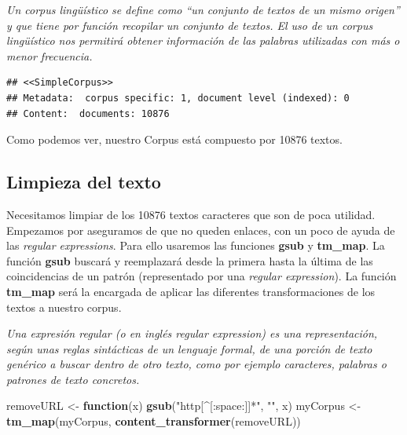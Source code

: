 \documentclass[]{article}
\newenvironment{Shaded}{\begin{snugshade}}{\end{snugshade}}
\newcommand{\ControlFlowTok}[1]{\textcolor[rgb]{0.13,0.29,0.53}{\textbf{#1}}}
\newcommand{\KeywordTok}[1]{\textcolor[rgb]{0.13,0.29,0.53}{\textbf{#1}}}
\newcommand{\NormalTok}[1]{#1}
\newcommand{\OperatorTok}[1]{\textcolor[rgb]{0.81,0.36,0.00}{\textbf{#1}}}
\newcommand{\StringTok}[1]{\textcolor[rgb]{0.31,0.60,0.02}{#1}}
\begin{document}
\emph{Un corpus lingüístico se define como ``un conjunto de textos de un
mismo origen'' y que tiene por función recopilar un conjunto de textos.
El uso de un corpus lingüístico nos permitirá obtener información de las
palabras utilizadas con más o menor frecuencia.}

\begin{Shaded}
\end{Shaded}

\begin{verbatim}
## <<SimpleCorpus>>
## Metadata:  corpus specific: 1, document level (indexed): 0
## Content:  documents: 10876
\end{verbatim}

Como podemos ver, nuestro Corpus está compuesto por 10876 textos.

\hypertarget{limpieza-del-texto}{%
\subsection{Limpieza del texto}\label{limpieza-del-texto}}

Necesitamos limpiar de los 10876 textos caracteres que son de poca
utilidad. Empezamos por aseguramos de que no queden enlaces, con un poco
de ayuda de las \emph{regular expressions}. Para ello usaremos las
funciones \textbf{gsub} y \textbf{tm\_map}. La función \textbf{gsub}
buscará y reemplazará desde la primera hasta la última de las
coincidencias de un patrón (representado por una \emph{regular
expression}). La función \textbf{tm\_map} será la encargada de aplicar
las diferentes transformaciones de los textos a nuestro corpus.

\emph{Una expresión regular (o en inglés regular expression) es una
representación, según unas reglas sintácticas de un lenguaje formal, de
una porción de texto genérico a buscar dentro de otro texto, como por
ejemplo caracteres, palabras o patrones de texto concretos.}

\begin{Shaded}
\begin{Highlighting}[]
\NormalTok{removeURL <-}\StringTok{ }\ControlFlowTok{function}\NormalTok{(x) }\KeywordTok{gsub}\NormalTok{(}\StringTok{"http[^[:space:]]*"}\NormalTok{, }\StringTok{""}\NormalTok{, x)  }
\NormalTok{myCorpus <-}\StringTok{ }\KeywordTok{tm_map}\NormalTok{(myCorpus, }\KeywordTok{content_transformer}\NormalTok{(removeURL))}
\end{Highlighting}
\end{Shaded}
\end{document}
